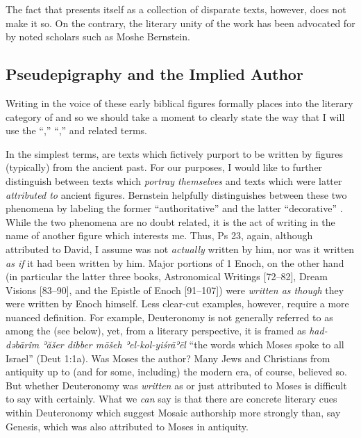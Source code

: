 The fact that \ga presents itself as a collection of disparate texts, however, does not make it so. On the contrary, the literary unity of the work has been advocated for by noted scholars such as Moshe Bernstein.\autocite{bernstein_jbl2009}
 
 
 \subsection{Pseudepigraphy and the Implied Author}
 Writing in the voice of these early biblical figures formally places \ga into the literary category of \psy and so we should take a moment to clearly state the way that I will use the ``\psy,'' ``\psa,'' and related terms.\autocites[The topic of \psy has received a large amount of very sophisticated attention in recent years. See especially][]{mroczek2016}{tigchelaar_tigchelaar2014}{reed_towsend-moulie2011}{reed_jts2009}{reed_ditomasso-turcescu2008}{najman_hilhorst-puech2007}{najman2003}

 In the simplest terms, \psa are texts which fictively purport to be written by figures (typically) from the ancient past. For our purposes, I would like to further distinguish between texts which \emph{portray themselves} and texts which were latter \emph{attributed to} ancient figures. Bernstein helpfully distinguishes between these two phenomena by labeling the former ``authoritative'' \psy and the latter ``decorative'' \psy.\autocite[He also identifies a third form, ``convenient'' \psy which is located somewhere between the two. I do not find this category as helpful.][3--7]{bernstein_chazon-etal1999} While the two phenomena are no doubt related, it is the act of writing in the name of another figure which interests me. Thus, Ps 23, again, although attributed to David, I assume was not \emph{actually} written by him, nor was it written \emph{as if} it had been written by him. Major portions of 1 Enoch, on the other hand (in particular the latter three books, Astronomical Writings {[}72--82{]}, Dream Visions {[}83--90{]}, and the Epistle of Enoch {[}91--107{]}) were \emph{written as though} they were written by Enoch himself. Less clear-cut examples, however, require a more nuanced definition. For example, Deuteronomy is not generally referred to as among the \psa (see below), yet, from a literary perspective, it is framed as \emph{had-dəbārîm ʾăšer dibber mōšeh ʾel-kol-yiśrāʾēl} ``the words which Moses spoke to all Israel'' (Deut 1:1a). Was Moses the author? Many Jews and Christians from antiquity up to (and for some, including) the modern era, of course, believed so. But whether Deuteronomy was \emph{written} as \psa or just attributed to Moses is difficult to say with certainly. What we \emph{can} say is that there are concrete literary cues within Deuteronomy which suggest Mosaic authorship more strongly than, say Genesis, which was also attributed to Moses in antiquity.


